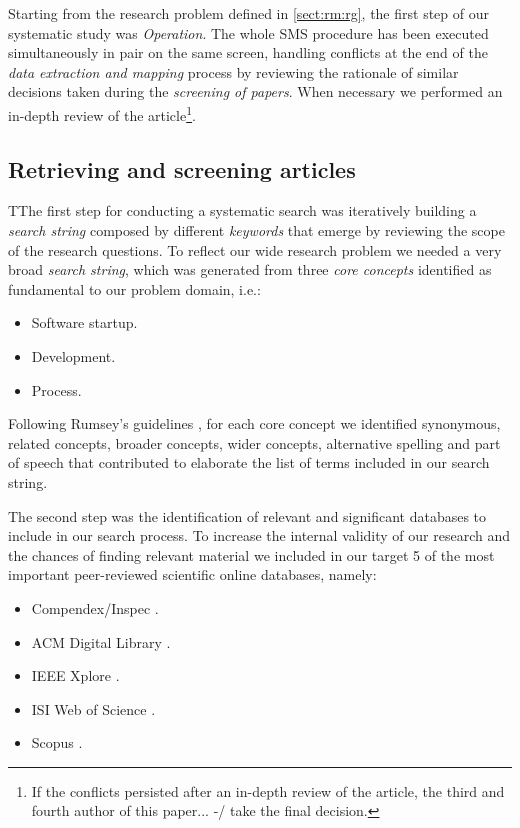\documentclass[final,5p,times,twocolumn]{elsarticle}
\begin{document}
Starting from the research problem defined in \ref{sect:rm:rg}, the first step of our systematic study was  \textit{Operation}. The whole SMS procedure has been executed simultaneously in pair on the same screen, handling conflicts at the end of the \textit{data extraction and mapping} process by reviewing the rationale of similar decisions taken during the \textit{screening of papers}. When necessary we performed an in-depth review of the article\footnote{If the conflicts persisted after an in-depth review of the article, the third and fourth author of this paper... -/ take the final decision.}.


\subsection{Retrieving and screening  articles} %
\label{sub:retr_screen}

TThe first step for conducting a systematic search was iteratively building a \textit{search string} composed by different  \textit{keywords} that emerge by reviewing the scope of the research questions. To reflect our wide research problem we needed a very broad \textit{search string}, which was generated from three \textit{core concepts} identified as fundamental to our problem domain, i.e.:

\begin{itemize}

\item Software startup.
\item Development.
\item Process.
\end{itemize}


Following Rumsey’s guidelines \cite{how-find-information}, for each core concept we identified synonymous, related concepts, broader concepts, wider concepts, alternative spelling and part of speech that contributed to elaborate the list of terms included in our search string.

The second step was the identification of relevant and significant databases to include in our search process. To increase the internal validity of our research and the chances of finding relevant material we included in our target 5 of the most important peer-reviewed scientific online databases, namely:

\begin{itemize}

\item Compendex/Inspec \cite{compendex}.
\item ACM Digital Library \cite{ACMsearch}.
\item IEEE Xplore \cite{IEEExpl}.
\item ISI Web of Science \cite{ISIweb}.
\item Scopus \cite{scopus}.
\end{itemize}
\end{document}
